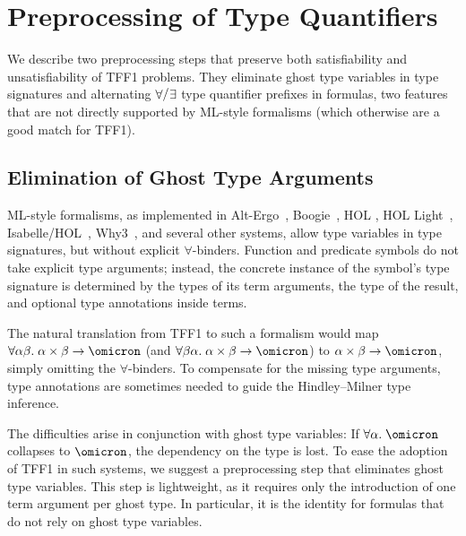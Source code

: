 \section{Preprocessing of Type Quantifiers}
\label{sec_preproc}

We describe two preprocessing steps that preserve both satisfiability and
unsatisfiability of TFF1 problems. They eliminate ghost type variables in type
signatures and alternating $\forall\raise.15ex\hbox{\ensuremath{\slash}}\vthinspace\exists$ type quantifier prefixes in
formulas, two features that are not directly supported by ML-style formalisms
(which otherwise are a good match for TFF1).

\subsection{Elimination of Ghost Type Arguments} \label{ssec:ghost}


ML-style formalisms, as implemented in Alt-Ergo~\cite{bobot-et-al-2008},
Boogie~\cite{leino-ruemmer-2010}, HOL \cite{gordon-melham-1993}, HOL
Light~\cite{harrison-1996}, Isabelle\slash HOL~\cite{nipkow-et-al-2002},
Why3~\cite{bobot-et-al-2011}, and several other systems, allow type variables
in type signatures, but without explicit $\forall$-binders.
Function and predicate symbols do not take explicit type
arguments; instead, the concrete instance of the symbol's type signature is
determined by the types of its term arguments, the type of the result, and
optional type annotations inside terms.

The natural translation from TFF1 to such a formalism would map $\forall
\alpha\beta.\; \alpha\times\beta\to\omicron$ (and $\forall \beta\alpha.\;
\alpha\times\beta\to\omicron$) to $\alpha\times\beta\to\omicron$, simply
omitting the $\forall$-binders. To compensate for the missing type arguments,
type annotations are sometimes needed to guide the Hindley--Milner type
inference.

The difficulties arise in conjunction with ghost type variables: If
$\forall\alpha.\;\omicron$ collapses to $\omicron$, the dependency on the type
is lost.
%
To ease the adoption of TFF1 in such systems, we suggest a preprocessing step
that eliminates ghost type variables. This step is lightweight, as it requires
only the introduction of one term argument per ghost type. In particular,
it is the identity for formulas that do not rely on ghost type variables.

